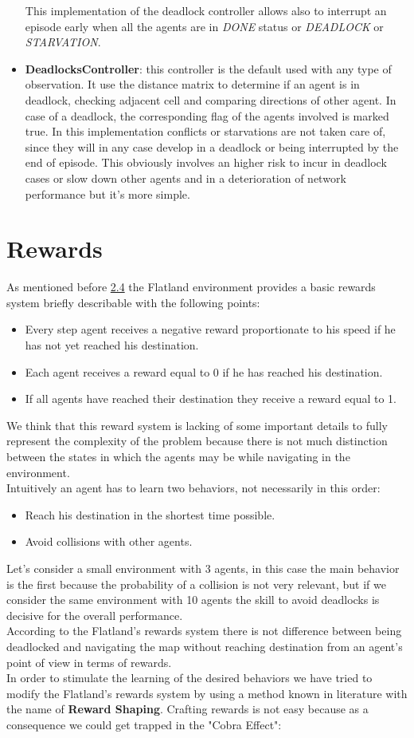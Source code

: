 \begin{itemize}
	This implementation of the deadlock controller allows also to interrupt an episode early when all the agents are in \textit{DONE} status or \textit{DEADLOCK} or \textit{STARVATION}.
	\item \textbf{DeadlocksController}: this controller is the default used with any type of observation. It use the distance matrix to determine if an agent is in deadlock, checking adjacent cell and comparing directions of other agent. In case of a deadlock, the corresponding flag of the agents involved is marked true. In this implementation conflicts or starvations are not taken care of, since they will in any case develop in a deadlock or being interrupted by the end of episode. This obviously involves an higher risk to incur in deadlock cases or slow down other agents and in a deterioration of network performance but it's more simple.
\end{itemize}
\section{Rewards}
As mentioned before \hyperref[sec:envRewards]{2.4} the Flatland environment provides a basic rewards system briefly describable with the following points:
\begin{itemize}
	\item Every step agent receives a negative reward proportionate to his speed if he has not yet reached his destination.
	\item Each agent receives a reward equal to 0 if he has reached his destination.
	\item If all agents have reached their destination they receive a reward equal to 1.
\end{itemize}
We think that this reward system is lacking of some important details to fully represent the complexity of the problem because there is not much distinction between the states in which the agents may be while navigating in the environment.\\
Intuitively an agent has to learn two behaviors, not necessarily in this order:
\begin{itemize}
	\item Reach his destination in the shortest time possible.
	\item Avoid collisions with other agents.
\end{itemize}
Let's consider a small environment with 3 agents, in this case the main behavior is the first because the probability of a collision is not very relevant, but if we consider the same environment with 10 agents the skill to avoid deadlocks is decisive for the overall performance.\\
According to the Flatland's rewards system there is not difference between being deadlocked and navigating the map without reaching destination from an agent's point of view in terms of rewards. \\
In order to stimulate the learning of the desired behaviors we have tried to modify the Flatland's rewards system by using a method known in literature with the name of \textbf{Reward Shaping}.
Crafting rewards is not easy because as a consequence we could get trapped in the "Cobra Effect":

